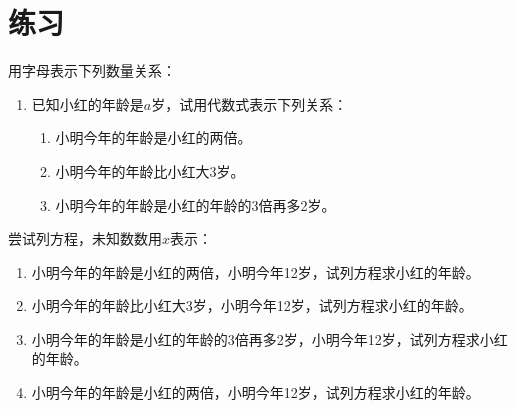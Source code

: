 \documentclass[DIN, pagenumber=false, fontsize=11pt, parskip=half]{scrartcl}
\begin{document}
\section{练习}
 用字母表示下列数量关系：
\begin{enumerate}
  
    \item 已知小红的年龄是$a$岁，试用代数式表示下列关系：
    \begin{enumerate}
        \item 小明今年的年龄是小红的两倍。
        \item 小明今年的年龄比小红大3岁。
        \item 小明今年的年龄是小红的年龄的3倍再多2岁。
    \end{enumerate}
\end{enumerate}
尝试列方程，未知数数用$x$表示：
\begin{enumerate}
    \item 小明今年的年龄是小红的两倍，小明今年12岁，试列方程求小红的年龄。
    \item 小明今年的年龄比小红大3岁，小明今年12岁，试列方程求小红的年龄。
    \item 小明今年的年龄是小红的年龄的3倍再多2岁，小明今年12岁，试列方程求小红的年龄。  
    \item  小明今年的年龄是小红的两倍，小明今年12岁，试列方程求小红的年龄。
\end{enumerate}
\end{document}

